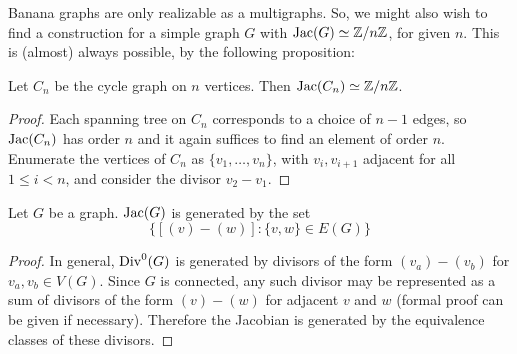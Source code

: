 \documentclass{article}
\begin{document}
Banana graphs are only realizable as a multigraphs. So, we might also
wish to find a construction for a simple graph $G$ with $\operatorname{Jac}(G)
\simeq \mathbb{Z}/n\mathbb{Z}$, for given $n$. This is (almost) always possible, by
the following proposition:

\begin{prop}
  Let $C_n$ be the cycle graph on $n$ vertices. Then $\operatorname{Jac}(C_n) \simeq \mathbb{Z}/n\mathbb{Z}$.
\end{prop}

\begin{proof}
  Each spanning tree on $C_n$ corresponds to a choice of $n-1$ edges,
  so $\operatorname{Jac}(C_n)$ has order $n$ and it again suffices to find an
  element of order $n$. Enumerate the vertices of $C_n$ as $\{v_1,
  \ldots, v_n\}$, with $v_i, v_{i+1}$ adjacent for all $1 \le i < n$,
  and consider the divisor $v_2 - v_1$.   
\end{proof}



\begin{lem}
  \label{lem:jac_generators}
  Let $G$ be a graph. $\operatorname{Jac}(G)$ is generated by the set \[\{[(v) -
  (w)]: \{v, w\} \in E(G)\}\]
\end{lem}

\begin{proof}
  In general, $\operatorname{Div}^0(G)$ is generated by divisors of the form $(v_a)
  - (v_b)$ for $v_a, v_b \in V(G)$. Since $G$ is connected, any such
  divisor may be represented as a sum of divisors of the form $(v) -
  (w)$ for adjacent $v$ and $w$ (formal proof can be given if
  necessary). Therefore the Jacobian is generated by the equivalence
  classes of these divisors.  
\end{proof}
\end{document}
